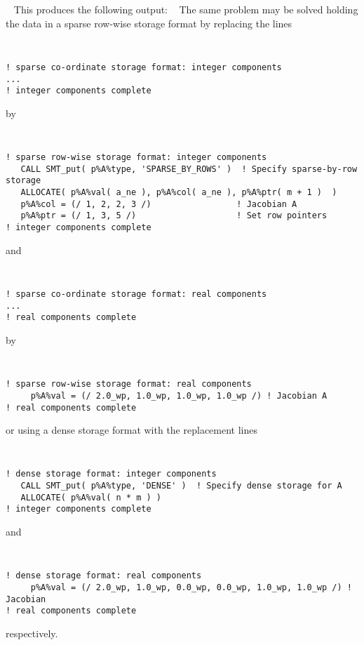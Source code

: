 \documentclass{galahad}
\begin{document}
{\tt \small
\VerbatimInput{\packageexample}
}
\noindent
This produces the following output:
{\tt \small
\VerbatimInput{\packageresults}
}
\noindent
The same problem may be solved holding the data in 
a sparse row-wise storage format by replacing the lines
{\tt \small
\begin{verbatim}
! sparse co-ordinate storage format: integer components
...
! integer components complete 
\end{verbatim}
}
\noindent
by
{\tt \small
\begin{verbatim}
! sparse row-wise storage format: integer components
   CALL SMT_put( p%A%type, 'SPARSE_BY_ROWS' )  ! Specify sparse-by-row storage
   ALLOCATE( p%A%val( a_ne ), p%A%col( a_ne ), p%A%ptr( m + 1 )  )
   p%A%col = (/ 1, 2, 2, 3 /)                 ! Jacobian A
   p%A%ptr = (/ 1, 3, 5 /)                    ! Set row pointers  
! integer components complete
\end{verbatim}
}
\noindent
and
{\tt \small
\begin{verbatim}
! sparse co-ordinate storage format: real components
...
! real components complete   
\end{verbatim}
}
\noindent
by
{\tt \small
\begin{verbatim}
! sparse row-wise storage format: real components
     p%A%val = (/ 2.0_wp, 1.0_wp, 1.0_wp, 1.0_wp /) ! Jacobian A
! real components complete   
\end{verbatim}
}
\noindent
or using a dense storage format with the replacement lines
{\tt \small
\begin{verbatim}
! dense storage format: integer components
   CALL SMT_put( p%A%type, 'DENSE' )  ! Specify dense storage for A
   ALLOCATE( p%A%val( n * m ) )
! integer components complete
\end{verbatim}
}
\noindent
and 
{\tt \small
\begin{verbatim}
! dense storage format: real components
     p%A%val = (/ 2.0_wp, 1.0_wp, 0.0_wp, 0.0_wp, 1.0_wp, 1.0_wp /) ! Jacobian
! real components complete   
\end{verbatim}
}
\noindent
respectively.
\end{document}
